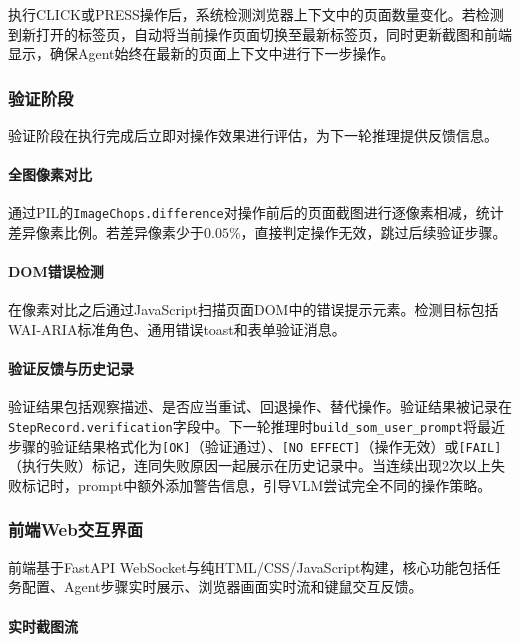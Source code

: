 \documentclass{SYSUReport}
\begin{document}
执行CLICK或PRESS操作后，系统检测浏览器上下文中的页面数量变化。若检测到新打开的标签页，自动将当前操作页面切换至最新标签页，同时更新截图和前端显示，确保Agent始终在最新的页面上下文中进行下一步操作。

\subsubsection{验证阶段}

验证阶段在执行完成后立即对操作效果进行评估，为下一轮推理提供反馈信息。

\paragraph{全图像素对比}

通过PIL的\texttt{ImageChops.difference}对操作前后的页面截图进行逐像素相减，统计差异像素比例。若差异像素少于$0.05\%$，直接判定操作无效，跳过后续验证步骤。

\paragraph{DOM错误检测}

在像素对比之后通过JavaScript扫描页面DOM中的错误提示元素。检测目标包括WAI-ARIA标准角色、通用错误toast和表单验证消息。

\paragraph{验证反馈与历史记录}

验证结果包括观察描述、是否应当重试、回退操作、替代操作。验证结果被记录在\texttt{StepRecord.verification}字段中。下一轮推理时\texttt{build\_som\_user\_prompt}将最近步骤的验证结果格式化为\texttt{[OK]}（验证通过）、\texttt{[NO EFFECT]}（操作无效）或\texttt{[FAIL]}（执行失败）标记，连同失败原因一起展示在历史记录中。当连续出现2次以上失败标记时，prompt中额外添加警告信息，引导VLM尝试完全不同的操作策略。

\subsubsection{前端Web交互界面}

前端基于FastAPI WebSocket与纯HTML/CSS/JavaScript构建，核心功能包括任务配置、Agent步骤实时展示、浏览器画面实时流和键鼠交互反馈。

\paragraph{实时截图流}
\end{document}
